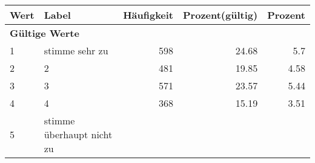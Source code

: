      \begin{longtable}{lXrrr}
     \toprule
     \textbf{Wert} & \textbf{Label} & \textbf{Häufigkeit} & \textbf{Prozent(gültig)} & \textbf{Prozent} \\
     \endhead
     \midrule
     \multicolumn{5}{l}{\textbf{Gültige Werte}}\\

     1 &
     \multicolumn{1}{X}{ stimme sehr zu   } &


       \num{598} &
       \num[round-mode=places,round-precision=2]{24.68} &
         \num[round-mode=places,round-precision=2]{5.7} \\

     2 &
     \multicolumn{1}{X}{ 2   } &


       \num{481} &
       \num[round-mode=places,round-precision=2]{19.85} &
         \num[round-mode=places,round-precision=2]{4.58} \\

     3 &
     \multicolumn{1}{X}{ 3   } &


       \num{571} &
       \num[round-mode=places,round-precision=2]{23.57} &
         \num[round-mode=places,round-precision=2]{5.44} \\

     4 &
     \multicolumn{1}{X}{ 4   } &


       \num{368} &
       \num[round-mode=places,round-precision=2]{15.19} &
         \num[round-mode=places,round-precision=2]{3.51} \\

     5 &
     \multicolumn{1}{X}{ stimme überhaupt nicht zu   } &



\end{longtable}
